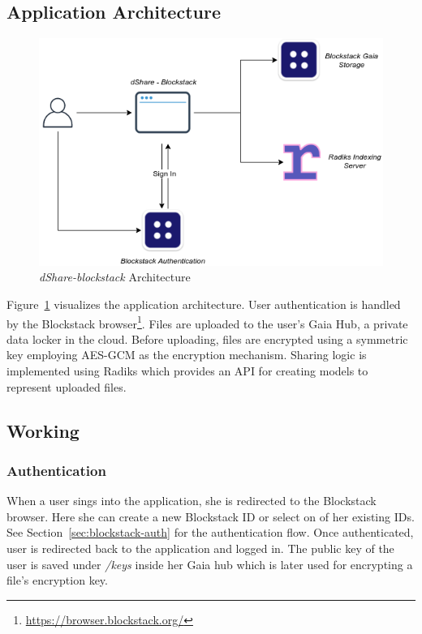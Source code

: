 		\subsection{Application Architecture}
			\begin{figure}[h]
				\includegraphics[width=\linewidth]{figures/dshare-blockstack}
				\caption{\label{fig:dshare-blockstack} \textit{dShare-blockstack} Architecture}
			\end{figure}
		
			Figure~\ref{fig:dshare-blockstack} visualizes the application architecture. User authentication is handled by the Blockstack browser\footnote{\url{https://browser.blockstack.org/}}. Files are uploaded to the user's Gaia Hub, a private data locker in the cloud. Before uploading, files are encrypted using a symmetric key employing AES-GCM as the encryption mechanism. Sharing logic is implemented using Radiks which provides an API for creating models to represent uploaded files.
		
		\subsection{Working}
		
			\subsubsection{Authentication}
				When a user sings into the application, she is redirected to the Blockstack browser. Here she can create a new Blockstack ID or select on of her existing IDs. See Section~\ref{sec:blockstack-auth} for the authentication flow. Once authenticated, user is redirected back to the application and logged in. The public key of the user is saved under \textit{/keys} inside her Gaia hub which is later used for encrypting a file's encryption key.
			
